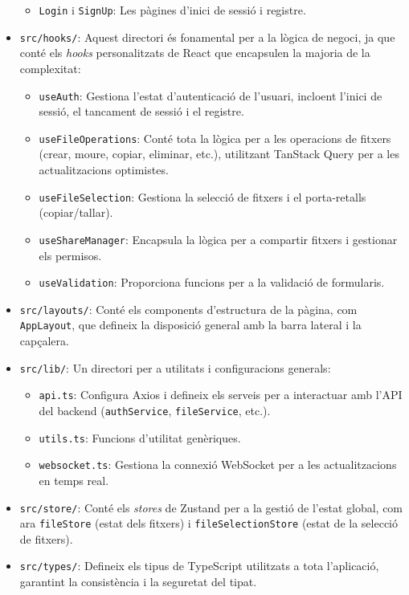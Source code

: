\begin{itemize}
\begin{itemize}
        \item \texttt{Login} i \texttt{SignUp}: Les pàgines d'inici de sessió i registre.
    \end{itemize}
    \item \texttt{src/hooks/}: Aquest directori és fonamental per a la lògica de negoci, ja que conté els \textit{hooks} personalitzats de React que encapsulen la majoria de la complexitat:
    \begin{itemize}
        \item \texttt{useAuth}: Gestiona l'estat d'autenticació de l'usuari, incloent l'inici de sessió, el tancament de sessió i el registre.
        \item \texttt{useFileOperations}: Conté tota la lògica per a les operacions de fitxers (crear, moure, copiar, eliminar, etc.), utilitzant TanStack Query per a les actualitzacions optimistes.
        \item \texttt{useFileSelection}: Gestiona la selecció de fitxers i el porta-retalls (copiar/tallar).
        \item \texttt{useShareManager}: Encapsula la lògica per a compartir fitxers i gestionar els permisos.
        \item \texttt{useValidation}: Proporciona funcions per a la validació de formularis.
    \end{itemize}
    \item \texttt{src/layouts/}: Conté els components d'estructura de la pàgina, com \texttt{AppLayout}, que defineix la disposició general amb la barra lateral i la capçalera.
    \item \texttt{src/lib/}: Un directori per a utilitats i configuracions generals:
    \begin{itemize}
        \item \texttt{api.ts}: Configura Axios i defineix els serveis per a interactuar amb l'API del backend (\texttt{authService}, \texttt{fileService}, etc.).
        \item \texttt{utils.ts}: Funcions d'utilitat genèriques.
        \item \texttt{websocket.ts}: Gestiona la connexió WebSocket per a les actualitzacions en temps real.
    \end{itemize}
    \item \texttt{src/store/}: Conté els \textit{stores} de Zustand per a la gestió de l'estat global, com ara \texttt{fileStore} (estat dels fitxers) i \texttt{fileSelectionStore} (estat de la selecció de fitxers).
    \item \texttt{src/types/}: Defineix els tipus de TypeScript utilitzats a tota l'aplicació, garantint la consistència i la seguretat del tipat.
\end{itemize}

